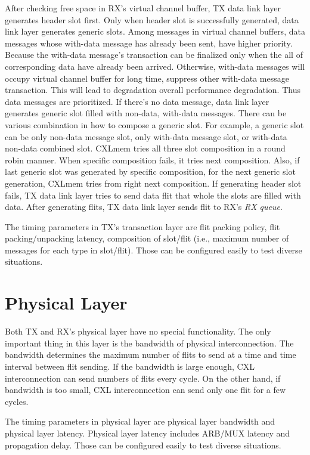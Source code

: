 After checking free space in RX's virtual channel buffer, TX data link layer generates header slot first. Only when header slot is successfully generated, data link layer generates generic slots. Among messages in virtual channel buffers, data messages whose with-data message has already been sent, have higher priority. Because the with-data message's transaction can be finalized only when the all of corresponding data have already been arrived. Otherwise, with-data messages will occupy virtual channel buffer for long time, suppress other with-data message transaction. This will lead to degradation overall performance degradation. Thus data messages are prioritized. If there's no data message, data link layer generates generic slot filled with non-data, with-data messages. There can be various combination in how to compose a generic slot. For example, a generic slot can be only non-data message slot, only with-data message slot, or with-data non-data combined slot. CXLmem tries all three slot composition in a round robin manner. When specific composition fails, it tries next composition. Also, if last generic slot was generated by specific composition, for the next generic slot generation, CXLmem tries from right next composition. If generating header slot fails, TX data link layer tries to send data flit that whole the slots are filled with data. After generating flits, TX data link layer sends flit to RX's \textit{RX queue}.

The timing parameters in TX's transaction layer are flit packing policy, flit packing/unpacking latency, composition of slot/flit (i.e., maximum number of messages for each type in slot/flit). Those can be configured easily to test diverse situations.

\section{Physical Layer} \label{sec:physical layer}
Both TX and RX's physical layer have no special functionality. The only important thing in this layer is the bandwidth of physical interconnection. The bandwidth determines the maximum number of flits to send at a time and time interval between flit sending. If the bandwidth is large enough, CXL interconnection can send numbers of flits every cycle. On the other hand, if bandwidth is too small, CXL interconnection can send only one flit for a few cycles.

The timing parameters in physical layer are physical layer bandwidth and physical layer latency. Physical layer latency includes ARB/MUX latency and propagation delay. Those can be configured easily to test diverse situations.

